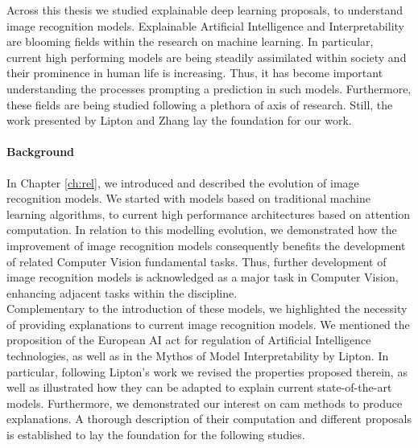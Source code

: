 \label{concs}
Across this thesis we studied explainable deep learning proposals, to understand image 
recognition models. Explainable Artificial Intelligence and Interpretability are blooming fields 
within the research on machine learning. In particular, current high performing models are 
being steadily assimilated within society and their prominence in human life is increasing. Thus, 
it has become important understanding the processes prompting a prediction in such models. 
Furthermore, these fields are being studied following a plethora of axis of research. Still, the 
work presented by Lipton \autocite{mythos_interp} and Zhang \autocite{zhang2021survey} lay the 
foundation for our work.\\

\paragraph{Background}
\noindent In Chapter \ref{ch:rel}, we introduced and described the evolution of image recognition 
models. We started with models based on traditional machine learning algorithms, to current high 
performance architectures based on attention computation. In relation to this modelling evolution, we 
demonstrated how the improvement of image recognition models consequently benefits the development 
of related Computer Vision fundamental tasks. Thus, further development of image recognition models 
is acknowledged as a major task in Computer Vision, enhancing adjacent tasks within the discipline.\\

\noindent Complementary to the introduction of these models, we highlighted the 
necessity of providing explanations to current image recognition models. We mentioned the proposition  
of the European AI act for regulation of Artificial Intelligence technologies, as well as in the 
Mythos of Model Interpretability by Lipton. In particular, following Lipton's work we 
revised the properties proposed therein, as well as illustrated how they can be adapted to explain 
current state-of-the-art models. Furthermore, we demonstrated our interest on \gls{cam} methods 
to produce explanations. A thorough description of their computation and different proposals is 
established to lay the foundation for the following studies.\\

